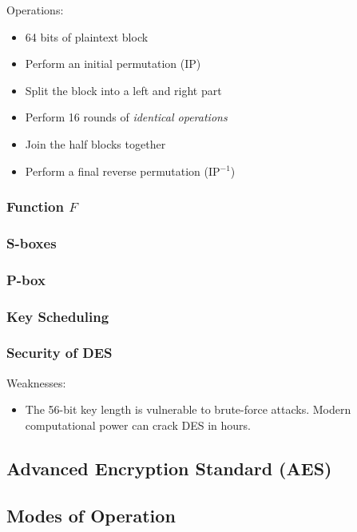Operations:
\begin{itemize}
    \item 64 bits of plaintext block
    \item Perform an initial permutation (IP)
    \item Split the block into a left and right part
    \item Perform 16 rounds of \emph{identical operations}
    \item Join the half blocks together
    \item Perform a final reverse permutation (IP$^{-1}$)
\end{itemize}

\subsubsection{Function \texorpdfstring{$F$}{F}}

\subsubsection{S-boxes}

\subsubsection{P-box}

\subsubsection{Key Scheduling}

\subsubsection{Security of DES}
Weaknesses: 
\begin{itemize}
    \item The 56-bit key length is vulnerable to brute-force attacks. Modern computational power can crack DES in hours.
\end{itemize}

\subsection{Advanced Encryption Standard (AES)}

\subsection{Modes of Operation}